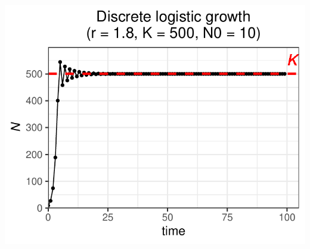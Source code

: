 \documentclass[
]{book}
\begin{document}
\begin{center}\includegraphics[width=0.7\linewidth]{04_Week_4_files/figure-latex/unnamed-chunk-2-1} \end{center}
\end{document}
